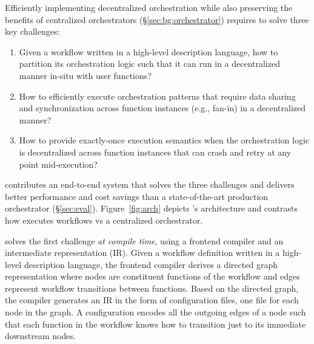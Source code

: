 Efficiently implementing decentralized orchestration while also preserving the
benefits of centralized orchestrators (\S\ref{sec:bg:orchestrator}) requires
\name{} to solve three key challenges:

\begin{enumerate}

	\item Given a workflow written in a high-level description language, how
	to partition its orchestration logic such that it can run in a
	decentralized manner in-situ with user functions?

	\item How to efficiently execute orchestration patterns that require data
	sharing and synchronization across function instances (e.g., fan-in) in a
	decentralized manner? 

	\item How to provide exactly-once execution semantics when the
	orchestration logic is decentralized across function instances that can
	crash and retry at any point mid-execution?

\end{enumerate}

\name{} contributes an end-to-end system that solves the three challenges and
delivers better performance and cost savings than a state-of-the-art
production orchestrator (\S\ref{sec:eval}). Figure~\ref{fig:arch} depicts
\name{}'s architecture and contrasts how \name{} executes workflows vs a
centralized orchestrator.  

\name{} solves the first challenge \emph{at compile time}, using a frontend
compiler and an intermediate representation (IR). Given a workflow definition
written in a high-level description language, the frontend compiler derives a
directed graph representation where nodes are constituent  functions of the
workflow and edges represent workflow transitions between
functions. Based on the directed graph, the compiler generates an IR in
the form of configuration files, one file for each node in the graph. A
\name{} configuration encodes all the outgoing edges of a node such that each
function in the workflow knows how to transition just to its immediate
downstream nodes.

